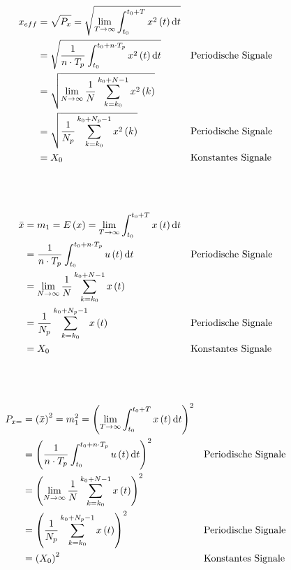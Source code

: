\begin{boxleft}
\end{boxleft}\begin{boxrightshaded}
\begin{align*}
x_{eff}&=\sqrt{P_x}=\sqrt{\lim_{T\to \infty}\int_{t_0}^{t_0+T} x^2\left(t\right)\mathop{}\!\mathrm{d} t}\\
&=\sqrt{\frac{1}{n\cdot T_p}\int_{t_0}^{t_0+n\cdot T_p} x^2\left(t\right)\mathop{}\!\mathrm{d} t}&&\text{Periodische Signale}\\
&=\sqrt{\lim_{N\to \infty}\frac{1}{N}\sum_{k=k_0}^{k_0+N-1}x^2\left(k\right)}\\
&=\sqrt{\frac{1}{N_p}\sum_{k=k_0}^{k_0+N_p-1}x^2\left(k\right)}&&\text{Periodische Signale}\\
&=X_0&&\text{Konstantes Signale}
\end{align*}
\end{boxrightshaded}


\begin{boxleft}
\\
\\
\end{boxleft}\begin{boxrightshaded}
\begin{align*}
\bar{x}&=m_1=E\left(x\right)=\lim_{T \to \infty}\int_{t_0}^{t_0+T}x\left(t\right) \mathop{}\!\mathrm{d} t\\
&=\frac{1}{n\cdot T_p}\int_{t_0}^{t_0+n\cdot T_p}u\left(t\right)\mathop{}\!\mathrm{d} t&&\text{Periodische Signale}\\
&=\lim_{N\to\infty}\frac{1}{N}\sum_{k=k_0}^{k_0+N-1}x\left(t\right)\\
&=\frac{1}{N_p}\sum_{k=k_0}^{k_0+N_p-1}x\left(t\right)&&\text{Periodische Signale}\\
&=X_0&&\text{Konstantes Signale}
\end{align*}
\end{boxrightshaded}


\begin{boxleft}
\\
\\
\end{boxleft}\begin{boxrightshaded}
\begin{align*}
P_{x=}&=\left(\bar{x}\right)^2=m_1^2=\left(\lim_{T \to \infty}\int_{t_0}^{t_0+T}x\left(t\right) \mathop{}\!\mathrm{d} t\right)^2\\
&=\left(\frac{1}{n\cdot T_p}\int_{t_0}^{t_0+n\cdot T_p}u\left(t\right)\mathop{}\!\mathrm{d} t\right)^2&&\text{Periodische Signale}\\
&=\left(\lim_{N\to\infty}\frac{1}{N}\sum_{k=k_0}^{k_0+N-1}x\left(t\right)\right)^2\\
&=\left(\frac{1}{N_p}\sum_{k=k_0}^{k_0+N_p-1}x\left(t\right)\right)^2&&\text{Periodische Signale}\\
&=\left(X_0\right)^2&&\text{Konstantes Signale}
\end{align*}
\end{boxrightshaded}


